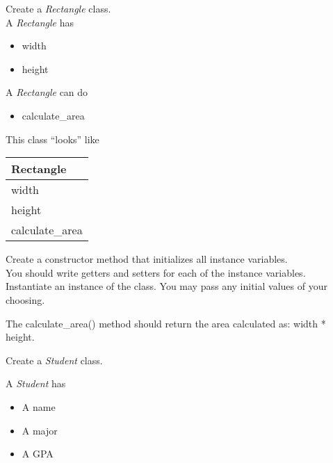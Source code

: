 \documentclass{article}
\newcommand{\tab}{\hspace*{0.25in}}
\begin{document}
\begin{enumerate}
	\begin{minipage}{.6\textwidth}
	\item Create a \textit{Rectangle} class.\\
		A \textit{Rectangle} has
		\begin{itemize}
			\item width 
			\item height
		\end{itemize}

		A \textit{Rectangle} can do
		\begin{itemize}
			\item calculate\_area
		\end{itemize}
	\end{minipage}
	\begin{minipage}{.4\textwidth}
		This class ``looks'' like 
				
		\vspace*{1em}
		\begin{tabular}{|l|}
			\hline Rectangle\\ \hline
			width\\ height \\  \hline
			calculate\_area\\ \hline
		\end{tabular}
	\end{minipage}


	\vspace*{2ex}
	Create a constructor method that initializes all instance variables.\\
	You should write getters and setters for each of the instance variables.\\
	Instantiate an instance of the class. You may pass any initial values of your choosing.
	
	The calculate\_area() method should return the area calculated as: width * height.\\




	\item Create a \textit{Student} class.\\
	\begin{minipage}{.6\textwidth}		
		A \textit{Student} has
		\begin{itemize}
			\item A name
			\item A major
			\item A GPA	
		\end{itemize}
	

\end{minipage}
\end{enumerate}
\end{document}
